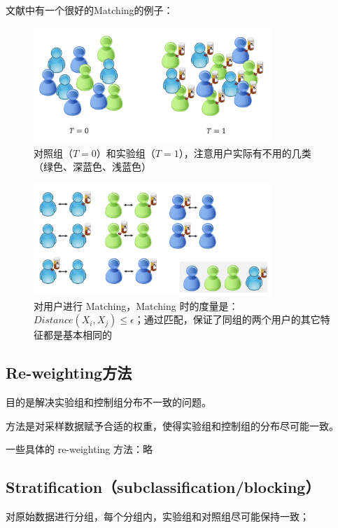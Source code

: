 \documentclass[12pt]{article}
\begin{document}
文献\cite{Causal_Inference_and_Stable_Learning}中有一个很好的Matching的例子：
\begin{figure}[H]
    \centering
    \caption*{对照组（$T=0$）和实验组（$T=1$），注意用户实际有不用的几类（绿色、深蓝色、浅蓝色）}
    \includegraphics[width=0.8\textwidth]{fig/Causal_Inference_and_Stable_Learning-Matching-1.png}
\end{figure}

\begin{figure}[H]
    \centering
    \caption*{对用户进行 Matching，Matching 时的度量是：$Distance(X_i, X_j) \le \epsilon$；通过匹配，保证了同组的两个用户的其它特征都是基本相同的}
    \includegraphics[width=0.8\textwidth]{fig/Causal_Inference_and_Stable_Learning-Matching-2.png}
\end{figure}

\subsection{Re-weighting方法}
目的是解决实验组和控制组分布不一致的问题。

方法是对采样数据赋予合适的权重，使得实验组和控制组的分布尽可能一致。

一些具体的 re-weighting 方法：略\cite{AAAI_2020_Tutorial_Representation_Learning_for_Causal_Inference}

\subsection{Stratiﬁcation（subclassiﬁcation/blocking）}
对原始数据进行分组，每个分组内，实验组和对照组尽可能保持一致；
\end{document}
